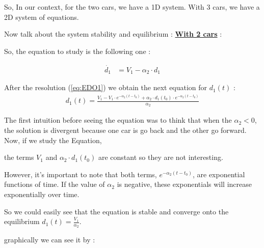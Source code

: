 \documentclass{article}
\begin{document}
		So, In our context, for the two cars, we have a 1D system. With 3 cars, we have a 2D system of equations.
		
		Now talk about the system stability and equilibrium : 
		\newline \newline \textbf{\underline{With 2 cars}} : \newline\newline
	
		So, the equation to study is the following one : 
		
		\begin{align*}
			\dot{d_1} &= V_1 - \alpha_2 \cdot d_1
		\end{align*}
		
		
		After the resolution (\ref{eq:EDO1}) we obtain the next equation for $d_1(t)$ : 
		\begin{align*}
			\boxed{d_1(t) = \frac{{V_1 - V_1 \cdot e^{-\alpha_2(t-t_0)} + \alpha_2 \cdot d_1(t_0) \cdot e^{-\alpha_2(t-t_0)}}}{\alpha_2}}
		\end{align*}
		
		The first intuition before seeing the equation was to think that when the $\alpha_2 < 0 $, the solution is divergent because one car is go back and the other go forward. Now, if we study the Equation,
		
		the terms $V_1$ and $\alpha_2 \cdot d_1(t_0)$ are constant so they are not interesting.
		
		However, it's important to note that both terms, $e^{-\alpha_2(t-t_0)}$, are exponential functions of time. If the value of $\alpha_2$ is negative, these exponentials will increase exponentially over time.
		
		So we could easily see that the equation is stable and converge onto the equilibrium $d_1(t)=\frac{V_1}{\alpha_2}$.
		
		graphically  we can see it by : 
		
\end{document}
